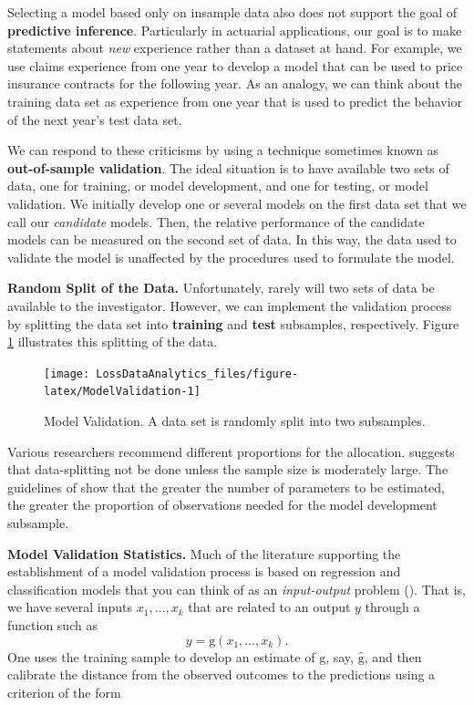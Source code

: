 \documentclass[]{book}
\theoremstyle{definition}
\theoremstyle{definition}
\theoremstyle{definition}
\theoremstyle{remark}
\begin{document}
Selecting a model based only on insample data also does not support the
goal of \textbf{predictive inference}. Particularly in actuarial
applications, our goal is to make statements about \emph{new} experience
rather than a dataset at hand. For example, we use claims experience
from one year to develop a model that can be used to price insurance
contracts for the following year. As an analogy, we can think about the
training data set as experience from one year that is used to predict
the behavior of the next year's test data set.

We can respond to these criticisms by using a technique sometimes known
as \textbf{out-of-sample validation}. The ideal situation is to have
available two sets of data, one for training, or model development, and
one for testing, or model validation. We initially develop one or
several models on the first data set that we call our \emph{candidate}
models. Then, the relative performance of the candidate models can be
measured on the second set of data. In this way, the data used to
validate the model is unaffected by the procedures used to formulate the
model.

\textbf{Random Split of the Data.} Unfortunately, rarely will two sets
of data be available to the investigator. However, we can implement the
validation process by splitting the data set into \textbf{training} and
\textbf{test} subsamples, respectively. Figure \ref{fig:ModelValidation}
illustrates this splitting of the data.

\begin{figure}

{\centering \texttt{[image: LossDataAnalytics\_files/figure-latex/ModelValidation-1]} 

}

\caption{Model Validation. A data set is randomly split into two subsamples.}\label{fig:ModelValidation}
\end{figure}

Various researchers recommend different proportions for the allocation.
\citet{snee1977validation} suggests that data-splitting not be done
unless the sample size is moderately large. The guidelines of
\citet{picard1990data} show that the greater the number of parameters to
be estimated, the greater the proportion of observations needed for the
model development subsample.

\textbf{Model Validation Statistics.} Much of the literature supporting
the establishment of a model validation process is based on regression
and classification models that you can think of as an
\emph{input-output} problem (\citet{james2013introduction}). That is, we
have several inputs \(x_1, \ldots, x_k\) that are related to an output
\(y\) through a function such as
\[y = \mathrm{g}\left(x_1, \ldots, x_k\right).\] One uses the training
sample to develop an estimate of \(\mathrm{g}\), say,
\(\hat{\mathrm{g}}\), and then calibrate the distance from the observed
outcomes to the predictions using a criterion of the form
\end{document}
